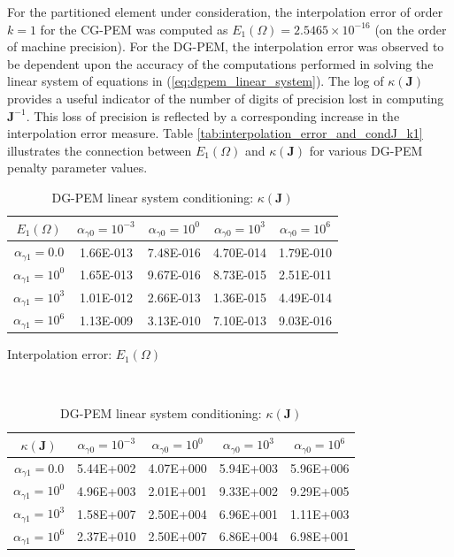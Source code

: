 For the partitioned element under consideration, the interpolation error of order $k=1$ for the CG-PEM was computed as $E_1 (\Omega) = 2.5465 \times 10^{-16}$ (on the order of machine precision). For the DG-PEM, the interpolation error was observed to be dependent upon the accuracy of the computations performed in solving the linear system of equations in (\ref{eq:dgpem_linear_system}). The log of $\kappa(\mathbf{J})$ provides a useful indicator of the number of digits of precision lost in computing $\mathbf{J}^{-1}$. This loss of precision is reflected by a corresponding increase in the interpolation error measure. Table \ref{tab:interpolation_error_and_condJ_k1} illustrates the connection between $E_1 (\Omega)$ and $\kappa(\mathbf{J})$ for various DG-PEM penalty parameter values. 

\begin{table}
\centering
\begin{subtable}{1.0\textwidth}
\centering
\begin{tabular}{| c || c | c | c | c |}
    \hline
$E_1 (\Omega)$ & $\alpha_{\gamma0} = 10^{-3}$ & $\alpha_{\gamma0} = 10^{0}$ & $\alpha_{\gamma0} = 10^{3}$ & $\alpha_{\gamma0} = 10^{6}$ \\ \hline \hline
$\alpha_{\gamma1} = 0.0$	& 1.66E-013 & 7.48E-016 & 4.70E-014 & 1.79E-010 \\ \hline
$\alpha_{\gamma1} = 10^{0}$ & 1.65E-013 & 9.67E-016 & 8.73E-015 & 2.51E-011 \\ \hline
$\alpha_{\gamma1} = 10^{3}$ & 1.01E-012 & 2.66E-013 & 1.36E-015 & 4.49E-014 \\ \hline
$\alpha_{\gamma1} = 10^{6}$ & 1.13E-009 & 3.13E-010 & 7.10E-013 & 9.03E-016 \\
    \hline
    \end{tabular}
    \caption{Interpolation error: $E_1 (\Omega)$}
    \label{tab:interpolation_error_k1}
\end{subtable}%
\\
\begin{subtable}{1.0\textwidth}
\centering
\begin{tabular}{| c || c | c | c | c |}
    \hline
$\kappa(\mathbf{J})$ & $\alpha_{\gamma0} = 10^{-3}$	&	$\alpha_{\gamma0} = 10^{0}$	&	$\alpha_{\gamma0} = 10^{3}$	&	$\alpha_{\gamma0} = 10^{6}$ \\ \hline \hline
$\alpha_{\gamma1} = 0.0$	&	5.44E+002 & 4.07E+000 & 5.94E+003 & 5.96E+006 \\ \hline
$\alpha_{\gamma1} = 10^{0}$	&	4.96E+003 & 2.01E+001 & 9.33E+002 & 9.29E+005 \\ \hline
$\alpha_{\gamma1} = 10^{3}$	&	1.58E+007 & 2.50E+004 & 6.96E+001 & 1.11E+003 \\ \hline
$\alpha_{\gamma1} = 10^{6}$	&	2.37E+010 & 2.50E+007 & 6.86E+004 & 6.98E+001 \\
    \hline
    \end{tabular}
    \caption{DG-PEM linear system conditioning: $\kappa(\mathbf{J})$}
    \label{tab:condJ_k1}
\end{subtable}


\end{table}
